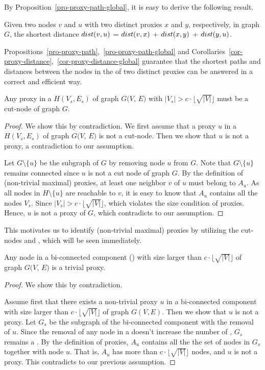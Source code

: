 By Proposition~\ref{pro-proxy-path-global}, it is easy to derive the following result.

\begin{cor}
\label{cor-proxy-distance-global} Given two nodes $v$ and $u$ with two distinct proxies $x$ and $y$, respectively, in graph $G$, the shortest distance $\dist(v, u)$ = $\dist(v, x)$ $+$ $\dist(x, y)$  $+$ $\dist(y, u)$.
\end{cor}


Propositions~\ref{pro-proxy-path},~\ref{pro-proxy-path-global} and Corollaries~\ref{cor-proxy-distance},~\ref{cor-proxy-distance-global} guarantee that the shortest paths and distances between the nodes in the \dras of two distinct proxies can be answered in a correct and efficient way.


\begin{prop}
\label{prop-proxy-cut} Any proxy in a \cc $H(V_s, E_s)$ of graph $G(V$, $E)$ with $|V_s|>c\cdot\lfloor\sqrt{|V|}\rfloor$ must be a cut-node of graph $G$.
\end{prop}

\begin{proof} We show this by contradiction. We first assume that a proxy $u$ in a \cc $H(V_s, E_s)$ of graph $G(V$, $E)$ is not a cut-node.  Then we show that $u$ is not a proxy, a contradiction to our assumption.

Let $G\setminus\{u\}$ be the subgraph of $G$ by removing node $u$ from $G$.  Note that $G\setminus\{u\}$ remains connected since $u$ is not a cut node of graph $G$. By the definition of (non-trivial maximal) proxies, at least one neighbor $v$ of $u$ must belong to $A_{u}$.  As all nodes in $H\setminus\{u\}$ are reachable to $v$, it is easy to know that $A_{u}$ contains all the nodes $V_s$.  Since $|V_s| > c\cdot\lfloor\sqrt{|V|}\rfloor$, which violates the size condition of proxies. Hence, $u$ is not a proxy of $G$, which contradicts to our assumption.
\end{proof}


This motivates us to identify (non-trivial maximal) proxies by utilizing the cut-nodes and \bccs, which will be seen immediately.


\begin{prop}
\label{prop-large-bcc} Any node in a bi-connected component (\bc)  with size larger than $c\cdot\lfloor\sqrt{|V|}\rfloor$ of graph $G(V$, $E)$ is a trivial proxy.
\end{prop}

\begin{proof} We show this by contradiction.

Assume first that there exists a non-trivial proxy $u$ in a bi-connected component with size larger than $c \cdot\lfloor\sqrt{|V|}\rfloor$ of graph $G(V, E)$.
Then we show that $u$ is not a proxy. Let $G_s$ be the subgraph of the bi-connected component with the removal of $u$. Since the removal of any node in a \bc doesn't increase the number of \ccs, $G_s$ remains a \cc. By the definition of proxies, $A_u$ contains all the  the set of nodes in $G_s$ together with node $u$. That is, $A_u$ has more than $c \cdot\lfloor\sqrt{|V|}\rfloor$ nodes, and $u$ is not a proxy. This contradicts to our previous assumption.
\end{proof}

